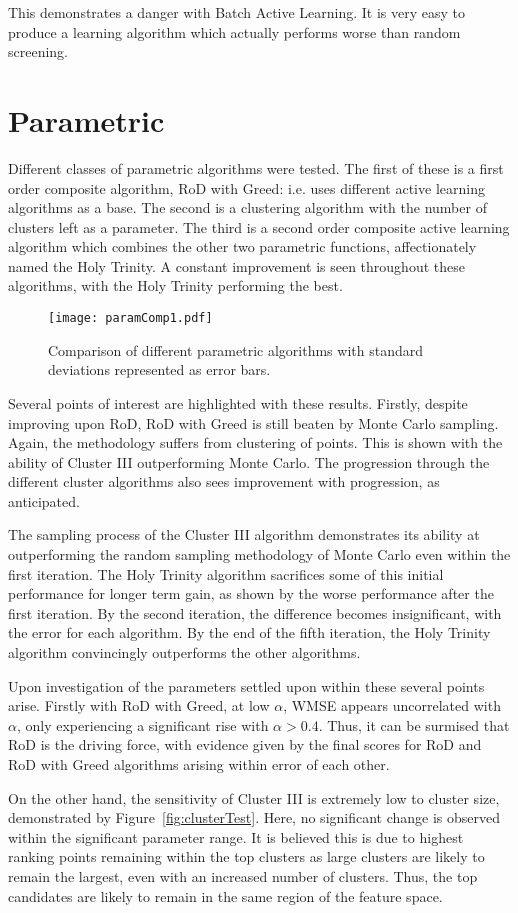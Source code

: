 This demonstrates a danger with Batch Active Learning. It is very easy to produce a learning algorithm which actually performs worse than random screening.

\section{Parametric}
Different classes of parametric algorithms were tested. The first of these is a first order composite algorithm, RoD with Greed: i.e. uses different active learning algorithms as a base. The second is a clustering algorithm with the number of clusters left as a parameter. The third is a second order composite active learning algorithm which combines the other two parametric functions, affectionately named the Holy Trinity. A constant improvement is seen throughout these algorithms, with the Holy Trinity performing the best.

\begin{figure}[h]
    \begin{center}
        \texttt{[image: paramComp1.pdf]}
        \caption[Non-parametric comparison]{Comparison of different parametric algorithms with standard deviations represented as error bars.}
        \label{fig:pComp}
    \end{center}
\end{figure}

Several points of interest are highlighted with these results. Firstly, despite improving upon RoD, RoD with Greed is still beaten by Monte Carlo sampling. Again, the methodology suffers from clustering of points. This is shown with the ability of Cluster III outperforming Monte Carlo. The progression through the different cluster algorithms also sees improvement with progression, as anticipated.

The sampling process of the Cluster III algorithm demonstrates its ability at outperforming the random sampling methodology of Monte Carlo even within the first iteration. The Holy Trinity algorithm sacrifices some of this initial performance for longer term gain, as shown by the worse performance after the first iteration. By the second iteration, the difference becomes insignificant, with the error for each algorithm. By the end of the fifth iteration, the Holy Trinity algorithm convincingly outperforms the other algorithms.

Upon investigation of the parameters settled upon within these several points arise. Firstly with RoD with Greed, at low $\alpha$, WMSE appears uncorrelated with $\alpha$, only experiencing a significant rise with $\alpha{}>0.4$. Thus, it can be surmised that RoD is the driving force, with evidence given by the final scores for RoD and RoD with Greed algorithms arising within error of each other.

On the other hand, the sensitivity of Cluster III is extremely low to cluster size, demonstrated by Figure~\ref{fig:clusterTest}. Here, no significant change is observed within the significant parameter range. It is believed this is due to highest ranking points remaining within the top clusters as large clusters are likely to remain the largest, even with an increased number of clusters. Thus, the top candidates are likely to remain in the same region of the feature space.